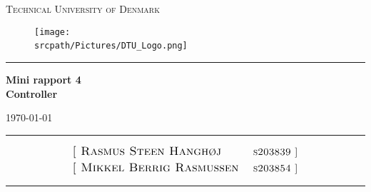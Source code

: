 \begin{titlepage}
\begin{center}
\textsc{\LARGE Technical University of Denmark}\\[0.5cm]


\begin{figure}[h]
    \centering
    \texttt{[image: \\srcpath/Pictures/DTU\_Logo.png]}~\\[1cm]
\end{figure}

\hrule
\vspace{1cm}
{\huge\bfseries Mini rapport 4 \\[0.1pt]}%
{\Large \bfseries Controller \\[0.3cm]}

{\large \today \\[0.1cm]} 
\vspace{1cm}
\hrule
\vspace{1cm}
\begin{align*}%
    &{\textsc{\large [ Rasmus Steen Hanghøj  }} 
    &&\text{\scshape s203839  ]}\\
    &{\textsc{\large [ Mikkel Berrig Rasmussen  }} 
    &&\text{\scshape s203854  ]}\\
\end{align*}
\hrule
\vspace{0.3cm}

\end{center}


\end{titlepage}
